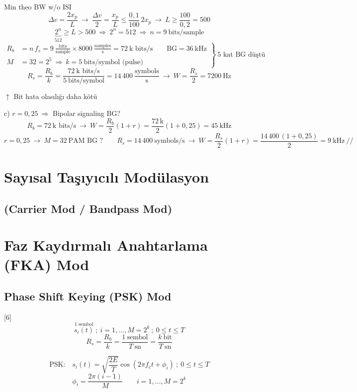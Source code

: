 \documentclass[11pt,a4paper]{article}
\begin{document}
Min theo BW w/o ISI
\[ \Delta v=\frac{2x_p}{L}\ \rightarrow\ \frac{\Delta v}{2}=\frac{x_p}{L}\le\frac{0{,}1}{100}\,2x_p\ \rightarrow\ L\ge\frac{100}{0{,}2}=500 \]
\[ \underbrace{2^n}_{512}\ge L>500\ \Rightarrow\ 2^n=512\ \Rightarrow\ n=9\ \text{bits/sample} \]
\[
\left.\begin{aligned}
R_b&=n\,f_s=9\ \frac{\text{bits}}{\text{sample}}\times 8000\ \frac{\text{samples}}{\text{s}}=72\ \text{k bits/s}\qquad \mathrm{BG}=36\ \mathrm{kHz}\\
M&=32=2^5\ \Rightarrow\ k=5\ \text{bits/symbol (pulse)}
\end{aligned}\right\}\ \text{5 kat BG düştü}
\]
\[ R_s=\frac{R_b}{k}=\frac{72\ \text{k bits/s}}{5\ \text{bits/symbol}}=14\,400\ \frac{\text{symbols}}{\text{s}}\ \rightarrow\ W=\frac{R_s}{2}=7200\ \mathrm{Hz} \]
\begin{flushright}
$\uparrow$ Bit hata olasılığı daha kötü
\end{flushright}

c) $r=0{,}25\ \Rightarrow$ Bipolar signaling BG?
\[ R_b=72\ \text{k bits/s}\ \rightarrow\ W=\frac{R_b}{2}(1+r)=\frac{72\,\mathrm{k}}{2}(1+0{,}25)=45\ \mathrm{kHz} \]
\[ r=0{,}25\ \rightarrow\ M=32\ \text{PAM BG ?}\qquad R_s=14\,400\ \text{symbols/s}\ \rightarrow\ W=\frac{R_s}{2}(1+r)=\frac{14\,400\,(1+0{,}25)}{2}=9\ \mathrm{kHz}\ /\!/ \]

\section{Sayısal Taşıyıcılı Modülasyon}
\subsection{(Carrier Mod / Bandpass Mod)}
\section{Faz Kaydırmalı Anahtarlama (FKA) Mod}
\subsection{Phase Shift Keying (PSK) Mod}

[6]
\[ \overset{\text{1 sembol}}{s_i(t)}\ ;\ i=1,\dots,M=2^k\ ;\ 0\le t\le T \]
\[ R_s=\frac{R_b}{k}=\frac{1\ \text{sembol}}{T\ \text{sn}}=\frac{k\ \text{bit}}{T\ \text{sn}} \]

\[ \text{PSK:}\quad s_i(t)=\sqrt{\frac{2E}{T}}\cos(2\pi f_ct+\phi_i)\ ;\ 0\le t\le T \]
\[ \phi_i=\frac{2\pi(i-1)}{M}\qquad i=1,\dots,M=2^k \]
\end{document}
